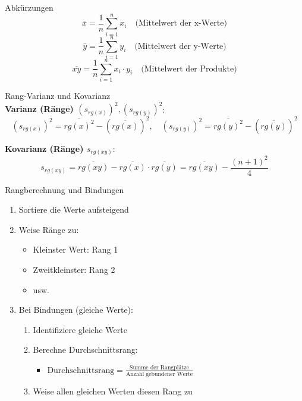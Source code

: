 \begin{concept}{Abkürzungen}\\
$$\bar{x} = \frac{1}{n}\sum_{i=1}^{n} x_i \quad \text{(Mittelwert der x-Werte)}$$
$$\bar{y} = \frac{1}{n}\sum_{i=1}^{n} y_i \quad \text{(Mittelwert der y-Werte)}$$
$$\overline{xy} = \frac{1}{n}\sum_{i=1}^{n} x_i \cdot y_i \quad \text{(Mittelwert der Produkte)}$$
\end{concept}

\begin{definition}{Rang-Varianz und Kovarianz}\\
\textbf{Varianz (Ränge) $(s_{rg(x)})^2, (s_{rg(y)})^2$}:
$$(s_{rg(x)})^2 = \overline{rg(x)^2} - (\overline{rg(x)})^2, \quad (s_{rg(y)})^2 = \overline{rg(y)^2} - (\overline{rg(y)})^2$$

\textbf{Kovarianz (Ränge) $s_{rg(xy)}$}:
$$s_{rg(xy)} = \overline{rg(xy)} - \overline{rg(x)} \cdot \overline{rg(y)} = \overline{rg(xy)} - \frac{(n+1)^2}{4}$$
\end{definition}

\begin{KR}{Rangberechnung und Bindungen}
\begin{enumerate}
    \item Sortiere die Werte aufsteigend
    \item Weise Ränge zu:
        \begin{itemize}
            \item Kleinster Wert: Rang 1
            \item Zweitkleinster: Rang 2
            \item usw.
        \end{itemize}
    \item Bei Bindungen (gleiche Werte):
        \begin{enumerate}
            \item Identifiziere gleiche Werte
            \item Berechne Durchschnittsrang:
                \begin{itemize}
                    \item $\text{Durchschnittsrang} = \frac{\text{Summe der Rangplätze}}{\text{Anzahl gebundener Werte}}$
                \end{itemize}
            \item Weise allen gleichen Werten diesen Rang zu
        \end{enumerate}
\end{enumerate}
\end{KR}

